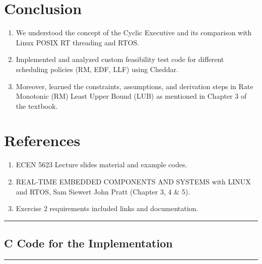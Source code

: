 \documentclass[a4paper,11pt]{article}%
\newenvironment{qanda}{\setlength{\parindent}{0pt}}{\bigskip}
\begin{document}
\begin{qanda}
	\section{Conclusion}
	\begin{enumerate}
		\item We understood  the concept of the Cyclic Executive and its comparison with Linux POSIX RT threading and RTOS.
		\item Implemented and analyzed custom feasibility test code for different scheduling policies (RM, EDF, LLF) using Cheddar.
		\item Moreover, learned the constraints, assumptions, and derivation steps in Rate Monotonic (RM) Least Upper Bound (LUB) as mentioned in Chapter 3 of the textbook.

	\end{enumerate}

	\section{References}
	\begin{enumerate}
		\item ECEN 5623 Lecture slides material and example codes.
		\item REAL-TIME EMBEDDED COMPONENTS AND SYSTEMS with LINUX and RTOS, Sam Siewert John
		      Pratt (Chapter 3, 4 \& 5).
		\item Exercise 2 requirements included links and documentation.
	\end{enumerate}


\end{qanda}




\vfill
\hrule
\vspace{0.5cm}
\pagebreak
\begin{appendices}
	\section{C Code for the Implementation}
	
\end{appendices}


\vspace{1cm}
\hrule
\vspace{0.5cm}


\end{document}
